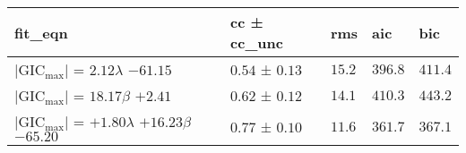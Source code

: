 \begin{tabular}{lllll}
\toprule
fit_eqn & cc ± cc_unc & rms & aic & bic \\
\midrule
$\vert{\text{GIC}_\text{max}}\vert$ = $2.12$$\lambda$ $-61.15$ & $0.54$ ± $0.13$ & $15.2$ & $396.8$ & $411.4$ \\
$\vert{\text{GIC}_\text{max}}\vert$ = $18.17$$\beta$ $+2.41$ & $0.62$ ± $0.12$ & $14.1$ & $410.3$ & $443.2$ \\
$\vert{\text{GIC}_\text{max}}\vert$ = $+1.80$$\lambda$ $+16.23$$\beta$ $-65.20$ & $0.77$ ± $0.10$ & $11.6$ & $361.7$ & $367.1$ \\
\bottomrule
\end{tabular}
